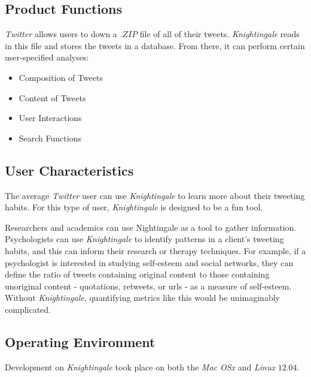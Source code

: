 \documentclass[a4paper, 12pt]{article}
\begin{document}
\subsection{Product Functions} \label{sec:functions}
\begin{adjustwidth}{2em}{0pt}
\textit{Twitter} allows users to down a $.ZIP$ file of all of their tweets. \textit{Knightingale} reads in this file and stores the tweets in a database. From there, it can perform certain user-specified analyses:
\begin{itemize}
\item Composition of Tweets
\item Content of Tweets
\item User Interactions
\item Search Functions
\end{itemize}
\end{adjustwidth}

\subsection{User Characteristics} \label{sec:userc}
\begin{adjustwidth}{2em}{0pt}
The average \textit{Twitter} user can use \textit{Knightingale} to learn more about their tweeting habits. For this type of user, \textit{Knightingale} is designed to be a fun tool. \newline

\noindent Researchers and academics can use Nightingale as a tool to gather information. Psychologists can use \textit{Knightingale} to identify patterns in a client's tweeting habits, and this can inform their research or therapy techniques. For example, if a psychologist is interested in studying self-esteem and social networks, they can define the ratio of tweets containing original content to those containing unoriginal content - quotations, retweets, or urls - as a measure of self-esteem. Without \textit{Knightingale}, quantifying metrics like this would be unimaginably complicated.
\end{adjustwidth}

\subsection{Operating Environment} \label{sec:operating}
\begin{adjustwidth}{2em}{0pt}
Development on \textit{Knightingale} took place on both the \textit{Mac OSx} and \textit{Linux} $12.04$.
\end{adjustwidth}
\end{document}
